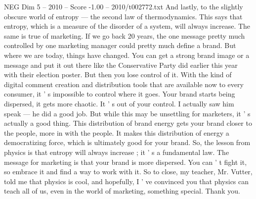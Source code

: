 \begin{textsample}{NEG Dim 5 – 2010 – Score -1.00 – 2010/t002772.txt}
And lastly, to the slightly obscure world of entropy — the second law of thermodynamics.
This says that entropy, which is a measure of the disorder of a system, will always increase.
The same is true of marketing.
If we go back 20 years, the one message pretty much controlled by one marketing manager could pretty much define a brand.
But where we are today, things have changed.
You can get a strong brand image or a message and put it out there like the Conservative Party did earlier this year with their election poster.
But then you lose control of it.
With the kind of digital comment creation and distribution tools that are available now to every consumer, it ' s impossible to control where it goes.
Your brand starts being dispersed, it gets more chaotic.
It ' s out of your control.
I actually saw him speak — he did a good job.
But while this may be unsettling for marketers, it ' s actually a good thing.
This distribution of brand energy gets your brand closer to the people, more in with the people.
It makes this distribution of energy a democratizing force, which is ultimately good for your brand.
So, the lesson from physics is that entropy will always increase ; it ' s a fundamental law.
The message for marketing is that your brand is more dispersed.
You can ' t fight it, so embrace it and find a way to work with it.
So to close, my teacher, Mr.
Vutter, told me that physics is cool, and hopefully, I ' ve convinced you that physics can teach all of us, even in the world of marketing, something special.
Thank you.

\end{textsample}

